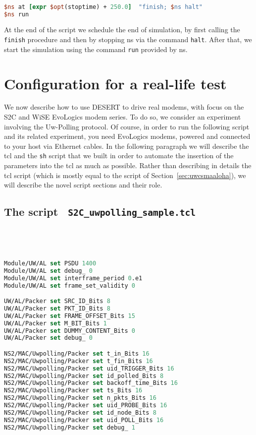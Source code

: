 \documentclass[11pt]{article}
\begin{document}
{\scriptsize\tt
\begin{lstlisting}[language=tcl]
$ns at [expr $opt(stoptime) + 250.0]  "finish; $ns halt" 
$ns run
\end{lstlisting}
}

At the end of the script we schedule the end of simulation, by first calling the {\tt finish} procedure and then by stopping ns via the command {\tt halt}. After that, we start the simulation using the command {\tt run} provided by ns.


\clearpage


\section{Configuration for a real-life test}
We now describe how to use DESERT to drive real modems, with focus on the S2C and WiSE EvoLogics modem series. To do so, we consider an experiment involving the Uw-Polling protocol.
Of course, in order to run the following script and its related experiment, you need EvoLogics modems, powered and connected to your host via Ethernet cables. In the following paragraph we will describe the tcl and the {\tt sh} script that we built in order to automate the insertion of the parameters into the tcl as much as possible. 
Rather than describing in details the tcl script (which is mostly equal to the script of Section~\ref{sec:uwcsmaaloha}), we will describe the novel script sections and their role.


\subsection{The script \ {\tt S2C\_uwpolling\_sample.tcl }}
\ 
{\scriptsize\tt
\begin{lstlisting}[language=tcl]
Module/UW/AL set PSDU 1400
Module/UW/AL set debug_ 0
Module/UW/AL set interframe_period 0.e1
Module/UW/AL set frame_set_validity 0

UW/AL/Packer set SRC_ID_Bits 8
UW/AL/Packer set PKT_ID_Bits 8
UW/AL/Packer set FRAME_OFFSET_Bits 15
UW/AL/Packer set M_BIT_Bits 1
UW/AL/Packer set DUMMY_CONTENT_Bits 0
UW/AL/Packer set debug_ 0

NS2/MAC/Uwpolling/Packer set t_in_Bits 16
NS2/MAC/Uwpolling/Packer set t_fin_Bits 16
NS2/MAC/Uwpolling/Packer set uid_TRIGGER_Bits 16
NS2/MAC/Uwpolling/Packer set id_polled_Bits 8
NS2/MAC/Uwpolling/Packer set backoff_time_Bits 16
NS2/MAC/Uwpolling/Packer set ts_Bits 16
NS2/MAC/Uwpolling/Packer set n_pkts_Bits 16
NS2/MAC/Uwpolling/Packer set uid_PROBE_Bits 16
NS2/MAC/Uwpolling/Packer set id_node_Bits 8
NS2/MAC/Uwpolling/Packer set uid_POLL_Bits 16
NS2/MAC/Uwpolling/Packer set debug_ 1
\end{lstlisting}
}
\end{document}
